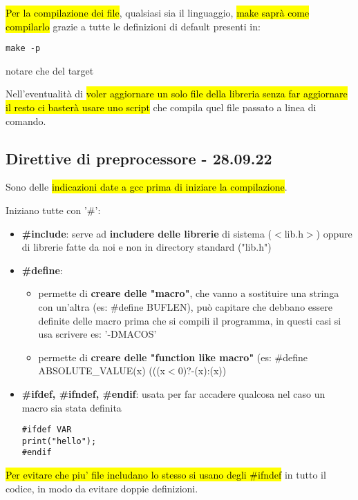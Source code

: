\hl{Per la compilazione dei file}, qualsiasi sia il linguaggio, \hl{make saprà come compilarlo} grazie a tutte le definizioni di default presenti in:

\begin{lstlisting}
make -p
\end{lstlisting}

notare che  del target

Nell'eventualità di \hl{voler aggiornare un solo file della libreria senza far aggiornare il resto ci basterà usare uno script} che compila quel file passato a linea di comando.



\subsection{Direttive di preprocessore - 28.09.22}
Sono delle \hl{indicazioni date a gcc prima di iniziare la compilazione}.

Iniziano tutte con '\#':
\begin{itemize}
	\item \textbf{\#include}: serve ad \textbf{includere delle librerie} di sistema ($<$lib.h$>$) oppure di librerie fatte da noi e non in directory standard ("lib.h")
	\item \textbf{\#define}:
		\begin{itemize}
			\item permette di \textbf{creare delle "macro"}, che vanno a sostituire una stringa con un'altra (es: \#define BUFLEN), può capitare che debbano essere definite delle macro prima che si compili il programma, in questi casi si usa scrivere es: '-DMACOS'
			\item permette di \textbf{creare delle "function like macro"} (es: \#define ABSOLUTE\_VALUE(x) (((x$<$0)?-(x):(x))  
		\end{itemize}
		
	\item \textbf{\#ifdef, \#ifndef, \#endif}: usata per far accadere qualcosa nel caso un macro sia stata definita
\begin{lstlisting}
#ifdef VAR
print("hello");
#endif
\end{lstlisting}

\end{itemize} 

\hl{Per evitare che piu' file includano lo stesso si usano degli \#ifndef} in tutto il codice, in modo da evitare doppie definizioni.


